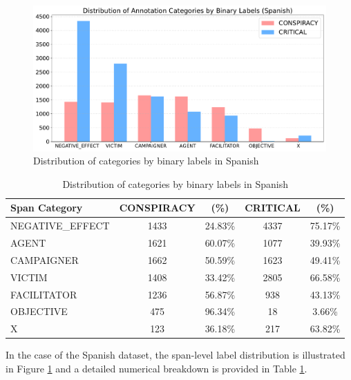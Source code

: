 \documentclass{Configuration_Files/PoliMi3i_thesis}
\begin{document}
\label{subsec:in_depth_analysis_en}
\begin{figure}[H]
 \centering
 \includegraphics[width=0.95\linewidth]{Images/grouped_chart_es_v2.pdf}
  \caption{\small Distribution of categories by binary labels in Spanish}
 \label{fig:grouped_chart_es}
\end{figure}
\FloatBarrier

\begin{table}[H] 
 \centering 
 \small
 \begin{tabular}{lcccc} 
 \hline 
\textbf{Span Category} & \textbf{CONSPIRACY} & \textbf{(\%)} & \textbf{CRITICAL} & \textbf{(\%)} \\
 \hline 
 NEGATIVE\_EFFECT    & 1433 & 24.83\% & 4337 & 75.17\%   \\ 
 AGENT               & 1621 & 60.07\% & 1077 & 39.93\%   \\ 
 CAMPAIGNER          & 1662 & 50.59\% & 1623 & 49.41\%   \\
 VICTIM              & 1408 & 33.42\% & 2805 & 66.58\%   \\ 
 FACILITATOR         & 1236 & 56.87\% & 938  & 43.13\%   \\ 
 OBJECTIVE           & 475  & 96.34\% & 18   & 3.66\%    \\ 
 X                   & 123  & 36.18\% & 217  & 63.82\%   \\ 
 \hline 
 \end{tabular} 
 \caption{\small Distribution of categories by binary labels in Spanish} 
 \label{tab:distribution_categories_by_binary_labels_es} 
\end{table}
\FloatBarrier

In the case of the Spanish dataset, the span-level label distribution is illustrated in Figure \ref{fig:grouped_chart_es} and a detailed numerical breakdown is provided in Table \ref{tab:distribution_categories_by_binary_labels_es}.
\end{document}
